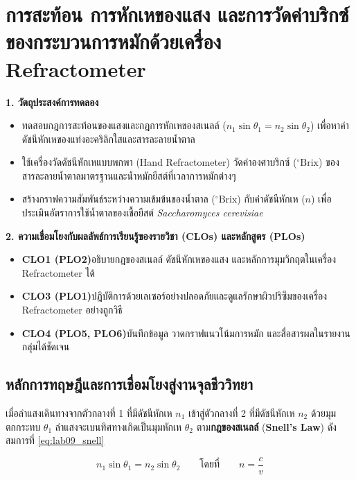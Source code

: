 \chapter{การสะท้อน การหักเหของแสง และการวัดค่าบริกซ์ของกระบวนการหมักด้วยเครื่อง Refractometer}

\begin{planbox}
\textbf{1. วัตถุประสงค์การทดลอง}
\begin{itemize}
    \item ทดสอบกฎการสะท้อนของแสงและกฎการหักเหของสเนลล์ ($n_1\sin\theta_1 = n_2\sin\theta_2$) เพื่อหาค่าดัชนีหักเหของแท่งอะคริลิกใสและสารละลายน้ำตาล
    \item ใช้เครื่องวัดดัชนีหักเหแบบพกพา (Hand Refractometer) วัดค่าองศาบริกซ์ ($^\circ\text{Brix}$) ของสารละลายน้ำตาลมาตรฐานและน้ำหมักยีสต์ที่เวลาการหมักต่างๆ
    \item สร้างกราฟความสัมพันธ์ระหว่างความเข้มข้นของน้ำตาล ($^\circ\text{Brix}$) กับค่าดัชนีหักเห ($n$) เพื่อประเมินอัตราการใช้น้ำตาลของเชื้อยีสต์ \textit{Saccharomyces cerevisiae}
\end{itemize}
\textbf{2. ความเชื่อมโยงกับผลลัพธ์การเรียนรู้ของรายวิชา (CLOs) และหลักสูตร (PLOs)}
\begin{itemize}
    \item \textbf{CLO1 (PLO2)}\quad อธิบายกฎของสเนลล์ ดัชนีหักเหของแสง และหลักการมุมวิกฤตในเครื่อง Refractometer ได้
    \item \textbf{CLO3 (PLO1)}\quad ปฏิบัติการด้วยเลเซอร์อย่างปลอดภัยและดูแลรักษาผิวปริซึมของเครื่อง Refractometer อย่างถูกวิธี
    \item \textbf{CLO4 (PLO5, PLO6)}\quad บันทึกข้อมูล วาดกราฟแนวโน้มการหมัก และสื่อสารผลในรายงานกลุ่มได้ชัดเจน
\end{itemize}
\end{planbox}

\section{หลักการทฤษฎีและการเชื่อมโยงสู่งานจุลชีววิทยา}

เมื่อลำแสงเดินทางจากตัวกลางที่ 1 ที่มีดัชนีหักเห $n_1$ เข้าสู่ตัวกลางที่ 2 ที่มีดัชนีหักเห $n_2$ ด้วยมุมตกกระทบ $\theta_1$ ลำแสงจะเบนทิศทางเกิดเป็นมุมหักเห $\theta_2$ ตาม\textbf{กฎของสเนลล์} (\textbf{Snell's Law}) ดังสมการที่ \eqref{eq:lab09_snell}

\begin{equation}
    n_1 \sin\theta_1 = n_2 \sin\theta_2 \qquad \text{โดยที่} \qquad n = \frac{c}{v}
    \label{eq:lab09_snell}
\end{equation}


